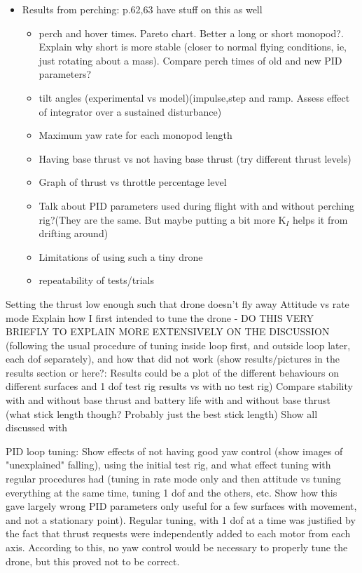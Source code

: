 \documentclass[12pt,a4paper]{article}
\begin{document}
\begin{itemize}
\begin{itemize}
\end{itemize} 
\item Results from perching: p.62,63 have stuff on this as well 
\begin{itemize}
\item perch and hover times. Pareto chart. Better a long or short monopod?. Explain why short is more stable (closer to normal flying conditions, ie, just rotating about a mass). Compare perch times of old and new PID parameters?
\item tilt angles (experimental vs model)(impulse,step and ramp. Assess effect of integrator over a sustained disturbance)
\item Maximum yaw rate for each monopod length
\item Having base thrust vs not having base thrust (try different thrust levels)
\item Graph of thrust vs throttle percentage level
\item Talk about PID parameters used during flight with and without perching rig?(They are the same. But maybe putting a bit more K$_I$ helps it from drifting around)
\item Limitations of using such a tiny drone
\item repeatability of tests/trials
\end{itemize}
\end{itemize}
Setting the thrust low enough such that drone doesn't fly away
Attitude vs rate mode
Explain how I first intended to tune the drone - DO THIS VERY BRIEFLY TO EXPLAIN MORE EXTENSIVELY ON THE DISCUSSION (following the usual procedure of tuning inside loop first, and outside loop later, each dof separately), and how that did not work (show results/pictures in the results section or here?: Results could be a plot of the different behaviours on different surfaces and 1 dof test rig results vs with no test rig) 
Compare stability with and without base thrust and battery life with and without base thrust (what stick length though? Probably just the best stick length)
Show all discussed with 

PID loop tuning: Show effects of not having good yaw control (show images of "unexplained" falling), using the initial test rig, and what effect tuning with regular procedures had (tuning in rate mode only and then attitude vs tuning everything at the same time, tuning 1 dof and the others, etc. Show how this gave largely wrong PID parameters only useful for a few surfaces with movement, and not a stationary point). Regular tuning, with 1 dof at a time was justified by the fact that thrust requests were independently added to each motor from each axis. According to this, no yaw control would be necessary to properly tune the drone, but this proved not to be correct.
\end{document}
